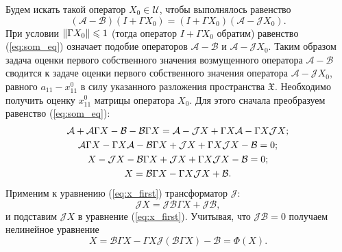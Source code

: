 
Будем искать такой оператор $X_0 \in \mathcal{U}$, чтобы выполнялось равенство
\begin{equation}\label{eq:som_eq}
	(\mathcal{A}-\mathcal{B})(I + \Gamma X_0) = (I + \Gamma X_0)(\mathcal{A}-\mathcal{J}X_0).
\end{equation}
При условии $\left\|\Gamma X_0\right\| \leqslant 1$ (тогда оператор $I + \Gamma X_0$ обратим) равенство (\ref{eq:som_eq}) означает подобие операторов $\mathcal{A}-\mathcal{B}$ и $\mathcal{A}-\mathcal{J}X_0$. Таким образом задача оценки первого собственного значения возмущенного оператора $\mathcal{A}-\mathcal{B}$ сводится к задаче оценки первого собственного значения оператора $\mathcal{A}-\mathcal{J}X_0$, равного $a_{11} - x^{0}_{11}$ в силу указанного разложения пространства $\mathfrak{X}$. Необходимо получить оценку $x^{0}_{11}$ матрицы оператора $X_0$. Для этого сначала преобразуем равенство (\ref{eq:som_eq}):
\begin{gather}
	\mathcal{A} + \mathcal{A} \Gamma X - \mathcal{B} - \mathcal{B} \Gamma X = \mathcal{A} - \mathcal{J} X + \Gamma X \mathcal{A} - \Gamma X \mathcal{J} X; \notag \\
	\mathcal{A} \Gamma X - \Gamma X \mathcal{A} - \mathcal{B} \Gamma X + \mathcal{J} X + \Gamma X \mathcal{J} X - \mathcal{B} = 0; \notag \\
	X - \mathcal{J} X - \mathcal{B} \Gamma X + \mathcal{J} X + \Gamma X \mathcal{J} X - \mathcal{B} = 0;  \notag \\
	X = \mathcal{B} \Gamma X - \Gamma X \mathcal{J} X + \mathcal{B}. \label{eq:x_first}
\end{gather}
Применим к уравнению (\ref{eq:x_first}) трансформатор $\mathcal{J}$:
$$
	\mathcal{J}X = \mathcal{J}\mathcal{B}\Gamma X + \mathcal{J}\mathcal{B},
$$ 
и подставим $\mathcal{J}X$ в уравнение (\ref{eq:x_first}). Учитывая, что $\mathcal{JB} = 0 $ получаем нелинейное уравнение
\begin{equation}\label{eq:x_main}
	X = \mathcal{B}\Gamma X - \Gamma X \mathcal{J}(\mathcal{B}\Gamma X) - \mathcal{B} = \Phi(X).
\end{equation}

